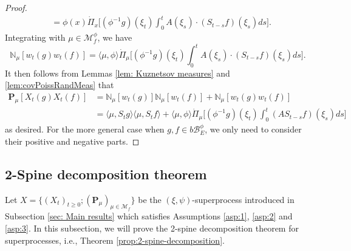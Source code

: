 \documentclass[UTF8]{pkuthss}
\theoremstyle{plain}
\theoremstyle{definition}
\numberwithin{equation}{section}
\begin{document}
\begin{proof}
\begin{align}
	&= \phi(x) \dot{\Pi}_x \Big[(\phi^{-1} g)(\xi_t) \int_0^t A(\xi_s)\cdot (S_{t-s} f)(\xi_s)ds \Big].
\end{align}
	Integrating with $\mu \in \mathcal M_f^{\phi}$, we have
\begin{equation}
\label{eq: sec moment for N measure}
	\mathbb N_\mu[w_t(g)w_t(f)]
	= \langle\mu, \phi\rangle \dot{\Pi}_{\mu} \Big[(\phi^{-1} g)(\xi_t) \int_0^t A(\xi_s)\cdot (S_{t-s} f)(\xi_s) ds\Big].
\end{equation}
It then follows from Lemmas \ref{lem: Kuznetsov measures} and
	\ref{lem:covPoissRandMeas} that
\begin{align}
	\mathbf P_\mu[ X_t( g) X_t( f)]
	&= \mathbb N_\mu[ w_t( g)] \mathbb N_\mu[ w_t( f)] + \mathbb N_\mu[ w_t( g) w_t( f)]\\
	&= \langle \mu, S_t g\rangle \langle \mu, S_t f\rangle + \langle \mu, \phi\rangle \dot{\Pi}_{\mu} \Big[ ( \phi^{-1} g)( \xi_t) \int_0^t (A S_{t-s} f)( \xi_s) ds \Big]
\end{align}
	as desired.
	For the more general case when $g,f\in b\mathscr B^\phi_E$, we only need to consider their positive and negative parts.
\end{proof}


\subsection{2-Spine decomposition theorem}
\label{size-biased-equation}
	Let $X=\{(X_t)_{t\geq 0}; (\mathbf P_\mu)_{\mu \in \mathcal M_f}\}$ be the $(\xi,\psi)$-superprocess introduced in Subsection \ref{sec: Main results} which satisfies Assumptions \ref{asp:1}, \ref{asp:2} and \ref{asp:3}.
	In this subsection, we will prove the 2-spine decomposition theorem for  superprocesses, i.e., Theorem \ref{prop:2-spine-decomposition}.
	
\end{document}
